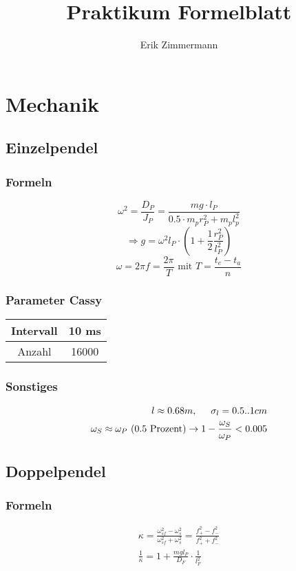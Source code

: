 \documentclass[10pt,a4paper]{article}
\author{Erik Zimmermann}
\title{Praktikum Formelblatt}
\begin{document}
\section{Mechanik}
\subsection{Einzelpendel}
\subsubsection{Formeln}
\begin{equation}
\omega^2=\frac{D_P}{J_P}=\frac{m g\cdot l_P}{0.5\cdot m_p r_P^2+m_p l_p^2}
\end{equation}
\begin{equation}
\Rightarrow g= \omega^2 l_P\cdot(1+\frac{1}{2}\frac{r_P^2}{l_P^2})
\end{equation}
\begin{equation}
\omega=2\pi f=\frac{2\pi}{T}\text{ mit } T=\frac{t_e-t_a}{n}
\end{equation}
\subsubsection{Parameter Cassy}
\begin{table}[H]\centering
\begin{tabular}{|c|c|}
\hline 
Intervall & 10 ms \\ 
\hline 
Anzahl & 16000 \\ 
\hline 
\end{tabular} 
\end{table}
\subsubsection{Sonstiges}
\begin{align}
l\approx 0.68m,\hspace{0.5cm}\sigma_l=0.5..1cm\\
\omega_S\approx \omega_P~(0.5\text{ Prozent}) \rightarrow 1-\frac{\omega_S}{\omega_P}<0.005
\end{align}
\subsection{Doppelpendel}
\subsubsection{Formeln}
\begin{align}
\kappa=\frac{\omega_{sf}^2-\omega_s^2}{\omega_{sf}^2+\omega_s^2}=\frac{f_+^2-f_-^2}{f_+^2+f_-^2}\\
\frac{1}{\kappa}=1+\frac{m g l_P}{D_F}\cdot \frac{1}{l_F^2}
\end{align}
\end{document}
